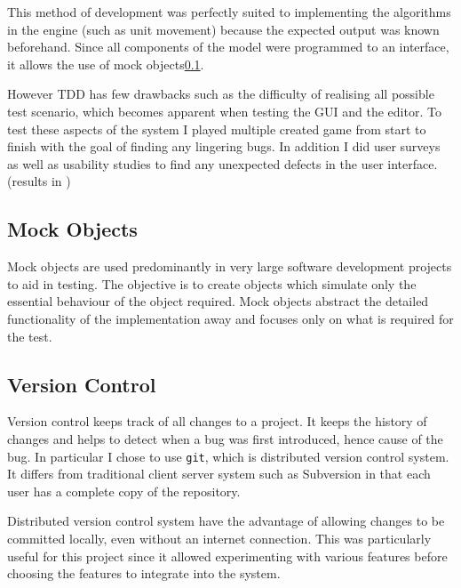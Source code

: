 This method of development was perfectly suited to implementing the algorithms in the engine (such as unit movement) because the expected output was known beforehand.  Since all components of the model were programmed to an interface, it allows the use of mock objects\ref{sec:mockobjects}.   


However TDD has few drawbacks such as the difficulty of realising all possible test scenario, which becomes apparent when testing the GUI and the editor. To test these aspects of the system I played multiple created game from start to finish with the goal of finding any lingering bugs. In addition I did user surveys as well as usability studies to find any unexpected defects in the user interface. (results in ) 

\subsection{Mock Objects}
\label{sec:mockobjects}
Mock objects are used predominantly in very large software development projects to aid in testing. The objective is to create objects which simulate only the essential behaviour of the object required. 
Mock objects abstract  the detailed functionality of the implementation away and  focuses only on what is required for the test.

\subsection{Version Control}
\label{sub:version_control}
Version control keeps track of all changes to a project. It keeps the history of changes and  helps to detect when a bug was first introduced, hence cause of the bug. In particular I chose to use \texttt{git}, which is distributed version control system. It differs from traditional client server system such as Subversion in that each user has a 
complete copy of the repository. 

Distributed version control system have the advantage of allowing changes to be committed locally, even without an internet connection.  This was particularly useful for this project since it allowed experimenting with various features before choosing the features to integrate into the system.
  

